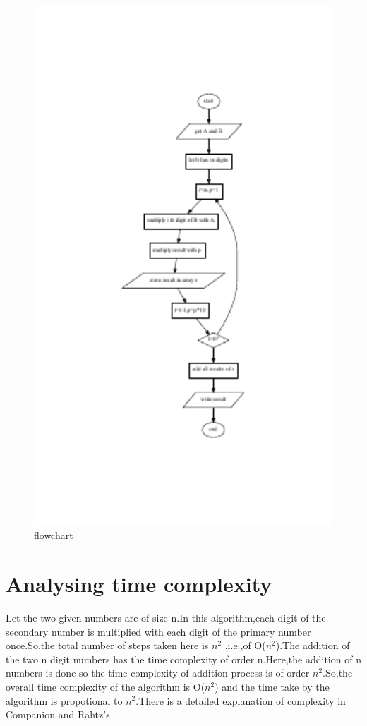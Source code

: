 \documentclass[12pt]{article}
\begin{document}
\begin{figure}[htp]
  \caption{flowchart}
  \centering
    \includegraphics[width=1.0\textwidth]{flow}
\end{figure}
\section{Analysing time complexity}
Let the two given numbers are of size n.In this algorithm,each digit of the secondary number is multiplied with each digit of the primary number once.So,the total number of steps taken here is $n^2$ ,i.e.,of O($n^2$).The addition of the two n digit numbers has the time complexity of order n.Here,the addition of n numbers is done so the time complexity of addition process is of order $n^2$.So,the overall time complexity of the algorithm is O($n^2$) and the time take by the algorithm is propotional to $n^2$.There is a detailed explanation of complexity in Companion\cite{goossens93} and Rahtz's\cite{rahtz89}


\end{document}
